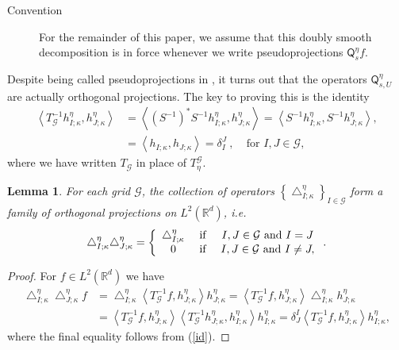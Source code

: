 \documentclass{amsart}%
\theoremstyle{plain}
\newtheorem{lemma}[theorem]{Lemma}
\numberwithin{equation}{section}
\begin{document}
\begin{description}
\item[Convention] For the remainder of this paper, we assume that this doubly
smooth decomposition is in force whenever we write pseudoprojections
$\mathsf{Q}_{s}^{\eta}f$.
\end{description}

Despite being called pseudoprojections in \cite{Saw8}, it turns out that the
operators $\mathsf{Q}_{s,U}^{\eta}$ are actually orthogonal projections. The
key to proving this is the identity%
\begin{align}
\left\langle T_{\mathcal{G}}^{-1}h_{I;\kappa}^{\eta},h_{J;\kappa}^{\eta
}\right\rangle  &  =\left\langle \left(  S^{-1}\right)  ^{\ast}S^{-1}%
h_{I;\kappa}^{\eta},h_{J;\kappa}^{\eta}\right\rangle =\left\langle
S^{-1}h_{I;\kappa}^{\eta},S^{-1}h_{J;\kappa}^{\eta}\right\rangle ,\label{id}\\
&  =\left\langle h_{I;\kappa},h_{J;\kappa}\right\rangle =\delta_{I}%
^{J}\ ,\ \ \ \ \ \text{for }I,J\in\mathcal{G},\nonumber
\end{align}
where we have written $T_{\mathcal{G}}$ in place of $T_{\eta}^{\mathcal{G}}$.

\begin{lemma}
\label{Q is proj}For each grid $\mathcal{G}$, the collection of operators
$\left\{  \bigtriangleup_{I;\kappa}^{\eta}\right\}  _{I\in\mathcal{G}}$ form a
family of orthogonal projections on $L^{2}\left(  \mathbb{R}^{d}\right)  $,
i.e.%
\[
\bigtriangleup_{I;\kappa}^{\eta}\bigtriangleup_{J;\kappa}^{\eta}=\left\{
\begin{array}
[c]{ccc}%
\bigtriangleup_{I;\kappa}^{\eta} & \text{ if } & I,J\in\mathcal{G}\text{ and
}I=J\\
0 & \text{ if } & I,J\in\mathcal{G}\text{ and }I\not =J,
\end{array}
\right.  .
\]

\end{lemma}

\begin{proof}
For $f\in L^{2}\left(  \mathbb{R}^{d}\right)  $ we have%
\begin{align*}
\bigtriangleup_{I;\kappa}^{\eta}\bigtriangleup_{J;\kappa}^{\eta}f &
=\bigtriangleup_{I;\kappa}^{\eta}\left\langle T_{\mathcal{G}}^{-1}%
f,h_{J;\kappa}^{\eta}\right\rangle h_{J;\kappa}^{\eta}=\left\langle
T_{\mathcal{G}}^{-1}f,h_{J;\kappa}^{\eta}\right\rangle \bigtriangleup
_{I;\kappa}^{\eta}h_{J;\kappa}^{\eta}\\
&  =\left\langle T_{\mathcal{G}}^{-1}f,h_{J;\kappa}^{\eta}\right\rangle
\left\langle T_{\mathcal{G}}^{-1}h_{J;\kappa}^{\eta},h_{I;\kappa}^{\eta
}\right\rangle h_{I;\kappa}^{\eta}=\delta_{J}^{I}\left\langle T_{\mathcal{G}%
}^{-1}f,h_{J;\kappa}^{\eta}\right\rangle h_{I;\kappa}^{\eta},
\end{align*}
where the final equality follows from (\ref{id}).
\end{proof}
\end{document}
